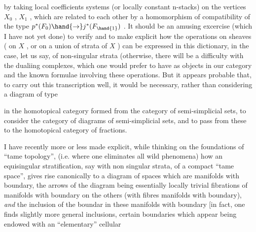 

by taking local coefficients systems (or locally constant n-stacks) on
the vertices $X_0$ , $X_1$ , which are related to each other by a homomorphism
of compatibility of the type $p^*(F_0)\hand{\to} j^*(F_{\hand{1}})$ . It should be an amusing
excercise (which I have not yet done) to verify and to make explicit how
the   operations on sheaves ( on $X$ , or on a  union of strata of $X$ )
can be expressed in this dictionary, in the case, let us say, of non-singular
strata (otherwise, there will be a difficulty with the dualiing complexes,
which one would prefer to have as objects in our category\hand{)}\hand{,} and  
 the known formulae involving these operations\deleted{)}. But it appears
probable that, to carry out this transcription well, it would be necessary,
rather than considering a diagram of type

\diagram{\begin{tikzcd}
\bullet \arrow[r] \arrow[d] & \bullet \\
\bullet &
\end{tikzcd}}

in the homotopical category formed from the category of semi-simplicial sets,
to consider the category of diagrams of semi-simplicial sets, and to pass from
these to the homotopical category of fractions.

I have recently more or less made explicit, while thinking on the
foundations of ``tame topology'', (i.e. where one  eliminates  all
wild phenomena) how an equisingular stratification, say with non singular
strata, of a compact ``tame space'', gives rise canonically to a diagram of spaces
which are manifolds with boundary,  the arrows of the diagram being essentially
locally trivial fibrations of manifolds with boundary on the others (with
fibres  manifolds with boundary), \textit{and} the inclusion of the boundar in these
manifolds with boundary [in fact, one finds slightly more general inclusions,
certain boundaries which appear being endowed with an ``elementary'' cellular

